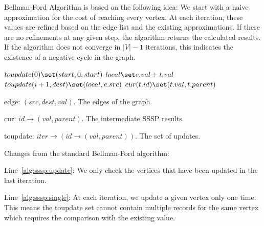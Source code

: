 
Bellman-Ford Algorithm \cite{bellman1958routing,ford1956network} is based on
the following idea: We start with a naive approximation for the cost of
reaching every vertex. At each iteration, these values are refined based on
the edge list and the existing approximations. If there are no refinements at
any given step, the algorithm returns the calculated results. If the algorithm
does not converge in $|V|-1$ iterations, this indicates the existence of a
negative cycle in the graph.


\begin{algorithm} \label{alg:sssp}
\begin{algorithmic}[1]
	\State $toupdate(0) \set (start,0,start)$
		 \label{alg:sssp:update}
		 		\State $local \set e.val + t.val$
		 		 \label{alg:sssp:single}
		 			\State $toupdate(i+1,dest) \set (local,e.src)$
		 		\EndIf
			\EndFor
		\EndFor
		 		\State $cur(t.id) \set (t.val,t.parent)$
		 	\EndIf
		\EndFor
	\EndFor
\end{algorithmic}
\end{algorithm}

\begin{description}
\item edge: $(src,dest,val)$. The edges of the graph.
\item cur: $id \rightarrow (val,parent)$. The intermediate SSSP results.
\item toupdate: $iter \rightarrow (id \rightarrow (val,parent))$. The set of updates.
\end{description}

Changes from the standard Bellman-Ford algorithm:

\begin{description}
\item Line~\ref{alg:sssp:update}: We only check the vertices that have been
updated in the last iteration.
\item Line~\ref{alg:sssp:single}: At each iteration, we update a given vertex
only one time. This means the toupdate set cannot contain multiple records
for the same vertex which requires the comparison with the existing value.
\end{description}

